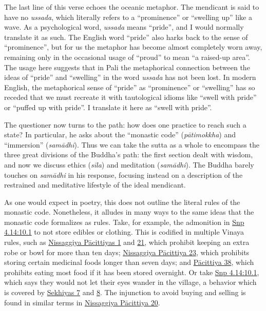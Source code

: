 \documentclass[12pt,openany]{book}%
\begin{document}
The last line of this verse echoes the oceanic metaphor. The mendicant is said to have no \textit{ussada}, which literally refers to a “prominence” or “swelling up” like a wave. As a psychological word, \textit{ussada} means “pride”, and I would normally translate it as such. The English word “pride” also harks back to the sense of “prominence”, but for us the metaphor has become almost completely worn away, remaining only in the occasional usage of “proud” to mean “a raised-up area”. The usage here suggests that in Pali the metaphorical connection between the ideas of “pride” and “swelling” in the word \textit{ussada} has not been lost. In modern English, the metaphorical sense of “pride” as “prominence” or “swelling” has so receded that we must recreate it with tautological idioms like “swell with pride” or “puffed up with pride”. I translate it here as “swell with pride”.

The questioner now turns to the path: how does one practice to reach such a state? In particular, he asks about the “monastic code” (\textit{\textsanskrit{pātimokkha}}) and “immersion” (\textit{\textsanskrit{samādhi}}). Thus we can take the sutta as a whole to encompass the three great divisions of the Buddha’s path: the first section dealt with wisdom, and now we discuss ethics (\textit{\textsanskrit{sīla}}) and meditation (\textit{\textsanskrit{samādhi}}). The Buddha barely touches on \textit{\textsanskrit{samādhi}} in his response, focusing instead on a description of the restrained and meditative lifestyle of the ideal mendicant.

As one would expect in poetry, this does not outline the literal rules of the monastic code. Nonetheless, it alludes in many ways to the same ideas that the monastic code formalizes as rules. Take, for example, the admonition in \href{https://suttacentral.net/snp4.14/en/sujato\#10.1}{Snp 4.14:10.1} to not store edibles or clothing. This is codified in multiple Vinaya rules, such as \href{https://suttacentral.net/pli{-}tv{-}bu{-}vb{-}np1/en/brahmali}{Nissaggiya Pācittiyas 1} and \href{https://suttacentral.net/pli{-}tv{-}bu{-}vb{-}np21/en/brahmali}{21}, which prohibit keeping an extra robe or bowl for more than ten days; \href{https://suttacentral.net/pli{-}tv{-}bu{-}vb{-}np23/en/brahmali}{Nissaggiya Pācittiya 23}, which prohibits storing certain medicinal foods longer than seven days; and \href{https://suttacentral.net/pli{-}tv{-}bu{-}vb{-}pc38/en/brahmali}{Pācittiya 38}, which prohibits eating most food if it has been stored overnight. Or take \href{https://suttacentral.net/snp4.14/en/sujato\#10.1}{Snp 4.14:10.1}, which says they would not let their eyes wander in the village, a behavior which is covered by \href{https://suttacentral.net/pli{-}tv{-}bu{-}vb{-}sk7/en/brahmali}{Sekhiyas 7} and \href{https://suttacentral.net/pli{-}tv{-}bu{-}vb{-}sk8/en/brahmali}{8}. The injunction to avoid buying and selling is found in similar terms in \href{https://suttacentral.net/pli{-}tv{-}bu{-}vb{-}np20/en/brahmali}{Nissaggiya Pācittiya 20}.
\end{document}
